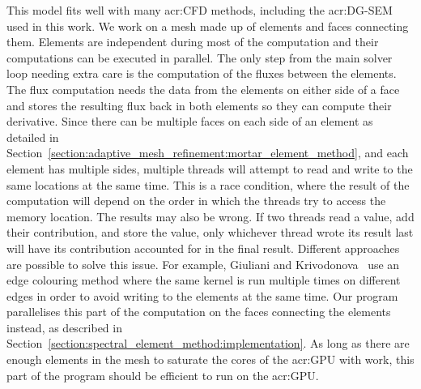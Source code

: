 This model fits well with many \acrshort{acr:CFD} methods, including the \acrshort{acr:DG-SEM} used
in this work. We work on a mesh made up of elements and faces connecting them. Elements are
independent during most of the computation and their computations can be executed in parallel. The
only step from the main solver loop needing extra care is the computation of the fluxes between the
elements. The flux computation needs the data from the elements on either side of a face and stores
the resulting flux back in both elements so they can compute their derivative. Since there can be
multiple faces on each side of an element as detailed in
Section~\ref{section:adaptive_mesh_refinement:mortar_element_method}, and each element has multiple
sides, multiple threads will attempt to read and write to the same locations at the same time. This
is a race condition, where the result of the computation will depend on the order in which the
threads try to access the memory location. The results may also be wrong. If two threads read a
value, add their contribution, and store the value, only whichever thread wrote its result last will
have its contribution accounted for in the final result. Different approaches are possible to solve
this issue. For example, Giuliani and Krivodonova~\cite{Giuliani2019} use an edge colouring method
where the same kernel is run multiple times on different edges in order to avoid writing to the
elements at the same time. Our program parallelises this part of the computation on the faces
connecting the elements instead, as described in
Section~\ref{section:spectral_element_method:implementation}. As long as there are enough elements
in the mesh to saturate the cores of the \acrshort{acr:GPU} with work, this part of the program
should be efficient to run on the \acrshort{acr:GPU}.

